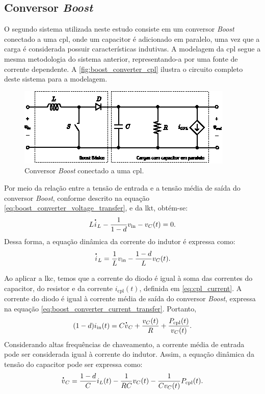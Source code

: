 \subsection{Conversor \textit{Boost}}

O segundo sistema utilizada neste estudo consiste em um conversor \textit{Boost} conectado a uma \acrshort{cpl}, onde um capacitor é adicionado em paralelo, uma vez que a carga é considerada possuir características indutivas. A modelagem da \acrshort{cpl} segue a mesma metodologia do sistema anterior, representando-a por uma fonte de corrente dependente. A \autoref{fig:boost_converter_cpl} ilustra o circuito completo deste sistema para a modelagem.

\begin{figure}[H]
  \centering
  \includegraphics[width=.73\textwidth]{figuras/boost_converter_cpl.eps}
  \caption{Conversor \textit{Boost} conectado a uma \acrshort{cpl}.}
  \label{fig:boost_converter_cpl}
\end{figure}

Por meio da relação entre a tensão de entrada e a tensão média de saída do conversor \textit{Boost}, conforme descrito na equação \eqref{eq:boost_converter_voltage_transfer}, e da \acrshort{lkt}, obtém-se: \begin{equation} L \dt{i}_L - \frac{1}{1-d} v_{\mathrm{in}} - v_C(t) = 0. \end{equation} Dessa forma, a equação dinâmica da corrente do indutor é expressa como: \begin{equation} \dt{i}_L = \frac{1}{L}v_{\mathrm{in}} - \frac{1-d}{L}v_C(t) \label{eq:boost_converter_current}. \end{equation}

Ao aplicar a \acrshort{lkc}, temos que a corrente do diodo é igual à soma das correntes do capacitor, do resistor e da corrente $i_{\mathrm{cpl}}(t)$, definida em \eqref{eq:cpl_current}. A corrente do diodo é igual à corrente média de saída do conversor \textit{Boost}, expressa na equação \eqref{eq:boost_converter_current_transfer}. Portanto, \begin{equation} (1 - d) i_{\mathrm{in}}(t) = C\dt{v}_C + \frac{v_C(t)}{R} + \frac{P_{\mathrm{cpl}}(t)}{v_C(t)}.\end{equation} Considerando altas frequências de chaveamento, a corrente média de entrada pode ser considerada igual à corrente do indutor. Assim, a equação dinâmica da tensão do capacitor pode ser expressa como: \begin{equation} \dt{v}_C = \frac{1 - d}{C} i_L(t) - \frac{1}{RC}v_C(t) - \frac{1}{Cv_C(t)}P_{\mathrm{cpl}}(t). \label{eq:boost_converter_voltage}\end{equation}

